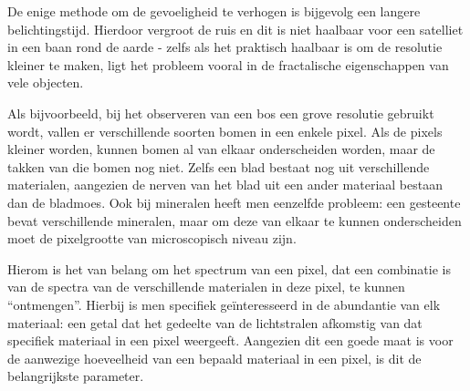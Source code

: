 \documentclass[12pt]{report}
\begin{document}
De enige methode om de gevoeligheid te verhogen is bijgevolg een langere belichtingstijd. Hierdoor vergroot de ruis en dit is niet haalbaar voor een satelliet in een baan rond de aarde - zelfs als het praktisch haalbaar is om de resolutie kleiner te maken, ligt het probleem vooral in de fractalische eigenschappen van vele objecten. 

Als bijvoorbeeld, bij het observeren van een bos een grove resolutie gebruikt wordt, vallen er verschillende soorten bomen in een enkele pixel. Als de pixels kleiner worden, kunnen bomen al van elkaar onderscheiden worden, maar de takken van die bomen nog niet. Zelfs een blad bestaat nog uit verschillende materialen, aangezien de nerven van het blad uit een ander materiaal bestaan dan de bladmoes. Ook bij mineralen heeft men eenzelfde probleem: een gesteente bevat verschillende mineralen, maar om deze van elkaar te kunnen onderscheiden moet de pixelgrootte van microscopisch niveau zijn. 

Hierom is het van belang om het spectrum van een pixel, dat een combinatie is van de spectra van de verschillende materialen in deze pixel, te kunnen ``ontmengen''. Hierbij is men specifiek ge\"interesseerd in de abundantie van elk materiaal: een getal dat het gedeelte van de lichtstralen afkomstig van dat specifiek materiaal in een pixel weergeeft. Aangezien dit een goede maat is voor de aanwezige hoeveelheid van een bepaald materiaal in een pixel, is dit de belangrijkste parameter.

%
%
\end{document}
